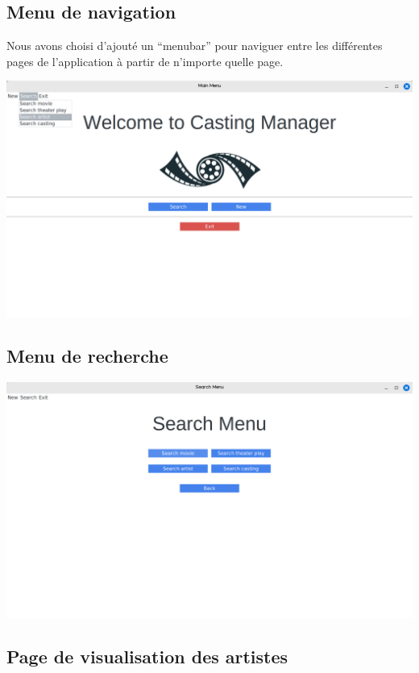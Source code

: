 \documentclass{article}
\begin{document}
\subsection{Menu de navigation}
Nous avons choisi d'ajouté un ``menubar'' pour naviguer entre les
différentes pages de l'application à partir de n'importe quelle page.
\begin{center}
  \includegraphics[scale=0.16]{menubar.png}
  
\end{center}


\subsection{Menu de recherche}

\begin{center}
  \includegraphics[scale=0.16]{search.png}
\end{center}

\subsection{Page de visualisation des artistes}
\end{document}
